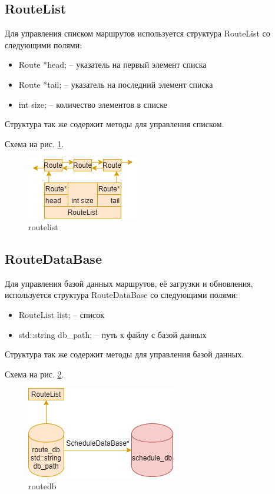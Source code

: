 \subsection{RouteList}

Для управления списком маршрутов используется структура RouteList со следующими полями:

\begin{itemize}
    \item Route *head; -- указатель на первый элемент списка
    \item Route *tail; -- указатель на последний элемент списка
    \item int size; -- количество элементов в списке
\end{itemize}

Структура так же содержит методы для управления списком.

Схема на рис. \ref{route_list}.

\begin{figure}[hpt!]
    \centering
    \includegraphics[width=0.4\linewidth]{photo/data_structures/route_list}
    \caption{routelist}
    \label{route_list}
\end{figure}

\subsection{RouteDataBase}

Для управления базой данных маршрутов, 
её загрузки и обновления, 
используется структура RouteDataBase со следующими полями: 

\begin{itemize}
    \item RouteList list{}; -- список
    \item std::string db\_path{}; -- путь к файлу с базой данных
\end{itemize}

Структура так же содержит методы для управления базой данных.

Схема на рис. \ref{route_db}.

\begin{figure}[hpt!]
    \centering
    \includegraphics[width=0.4\linewidth]{photo/data_structures/route_db}
    \caption{routedb}
    \label{route_db}
\end{figure}

